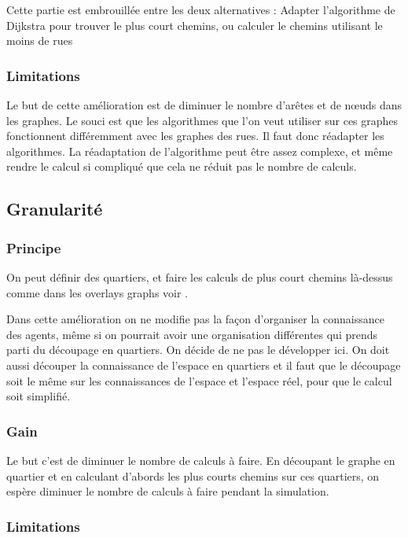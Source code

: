 \documentclass[a4paper]{article}
\newcommand{\comment}{}
\begin{document}
\comment{Cette partie est embrouillée entre les deux alternatives : Adapter
l'algorithme de Dijkstra pour trouver le plus court chemins, ou calculer le
chemins utilisant le moins de rues}

    \subsubsection{Limitations}

Le but de cette amélioration est de diminuer le nombre d'arêtes et de nœuds dans
les graphes. Le souci est que les algorithmes que l'on veut utiliser sur ces
graphes fonctionnent différemment avec les graphes des rues. Il faut donc
réadapter les algorithmes. La réadaptation de l'algorithme peut être assez
complexe, et même rendre le calcul si compliqué que cela ne réduit pas le nombre
de calculs.

  \subsection{Granularité}

    \subsubsection{Principe}

On peut définir des quartiers, et faire les calculs de plus court chemins
là-dessus comme dans les overlays graphs voir \cite{holzer2009}.

Dans cette amélioration on ne modifie pas la façon d'organiser la connaissance
des agents, même si on pourrait avoir une organisation différentes  qui prends
parti du découpage en quartiers. On décide de ne pas le développer ici. On doit
aussi découper la connaissance de l'espace en quartiers et il faut que le
découpage soit le même sur les connaissances de l'espace et l'espace réel, pour
que le calcul soit simplifié.

    \subsubsection{Gain}

Le but c'est de diminuer le nombre de calculs à faire. En découpant le graphe en
quartier et en calculant d'abords les plus courts chemins sur ces quartiers, on
espère diminuer le nombre de calculs à faire pendant la simulation.

    \subsubsection{Limitations}
\end{document}

